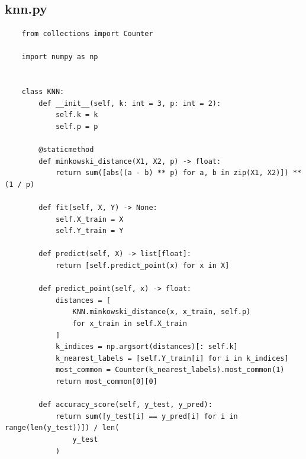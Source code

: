\documentclass[12pt,a4paper]{article}
\begin{document}
\subsection{knn.py}
\begin{lstlisting}
	from collections import Counter

	import numpy as np
	
	
	class KNN:
		def __init__(self, k: int = 3, p: int = 2):
			self.k = k
			self.p = p
	
		@staticmethod
		def minkowski_distance(X1, X2, p) -> float:
			return sum([abs((a - b) ** p) for a, b in zip(X1, X2)]) ** (1 / p)
	
		def fit(self, X, Y) -> None:
			self.X_train = X
			self.Y_train = Y
	
		def predict(self, X) -> list[float]:
			return [self.predict_point(x) for x in X]
	
		def predict_point(self, x) -> float:
			distances = [
				KNN.minkowski_distance(x, x_train, self.p)
				for x_train in self.X_train
			]
			k_indices = np.argsort(distances)[: self.k]
			k_nearest_labels = [self.Y_train[i] for i in k_indices]
			most_common = Counter(k_nearest_labels).most_common(1)
			return most_common[0][0]
	
		def accuracy_score(self, y_test, y_pred):
			return sum([y_test[i] == y_pred[i] for i in range(len(y_test))]) / len(
				y_test
			)
\end{lstlisting}
\end{document}
